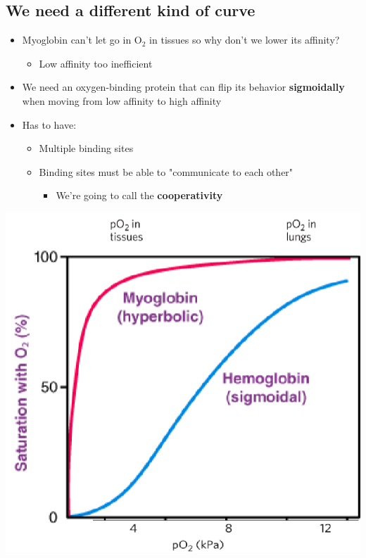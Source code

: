 \documentclass[10pt]{article}
\begin{document}
\subsection*{We need a different kind of curve}
\begin{itemize}
    \item Myoglobin can't let go in O$_2$ in tissues so why don't we lower its affinity?
    \begin{itemize}
        \item Low affinity too inefficient
    \end{itemize}
    \item We need an oxygen-binding protein that can flip its behavior \textbf{sigmoidally} when moving from low affinity to high affinity
    \item Has to have:
    \begin{itemize}
        \item Multiple binding sites
        \item Binding sites must be able to "communicate to each other"
        \begin{itemize}
            \item We're going to call the \textbf{cooperativity}
        \end{itemize}
    \end{itemize}
\end{itemize}
\begin{center}
    \includegraphics*[scale=0.6]{L2_13.png}
\end{center}
\end{document}

